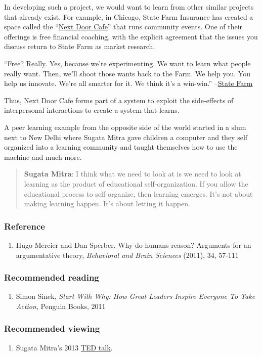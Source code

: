 In developing such a project, we would want to learn from other similar
projects that already exist. For example, in Chicago, State Farm
Insurance has created a space called the
``\href{https://www.nextdoorchi.com/}{Next Door Cafe}'' that runs
community events. One of their offerings is free financial coaching,
with the explicit agreement that the issues you discuss return to State
Farm as market research.

``Free? Really. Yes, because we're experimenting. We want to learn what
people really want. Then, we'll shoot those wants back to the Farm. We
help you. You help us innovate. We're all smarter for it. We think it's
a win-win.''
--\href{https://www.nextdoorchi.com/web/guest/nd-coaching}{State Farm}

Thus, Next Door Cafe forms part of a system to exploit the side-effects
of interpersonal interactions to create a system that learns.

A peer learning example from the opposite side of the world started in a
slum next to New Delhi where Sugata Mitra gave children a computer and
they self organized into a learning community and taught themselves how
to use the machine and much more. 

\begin{quote}
\textbf{Sugata Mitra}: I think what we need to look at is we need to
look at learning as the product of educational self-organization.  If
you allow the educational process to self-organize, then learning
emerges. It's not about making learning happen.  It's about letting it
happen.
\end{quote}

\subsubsection{Reference}

\begin{enumerate}
\item
  Hugo Mercier and Dan Sperber, Why do humans reason? Arguments for an
  argumentative theory, \emph{Behavioral and Brain Sciences} (2011), 34,
  57-111
\end{enumerate}
\subsubsection{Recommended reading}

\begin{enumerate}
\item
  Simon Sinek, \emph{Start With Why: How Great Leaders Inspire Everyone
  To Take Action}, Penguin Books, 2011
\end{enumerate}

\subsubsection{Recommended viewing}

\begin{enumerate}
\item
  Sugata Mitra's 2013
  \href{http://www.ted.com/talks/sugata\_mitra\_build\_a\_school\_in\_the\_cloud.html}{TED
    talk}.
\end{enumerate}
